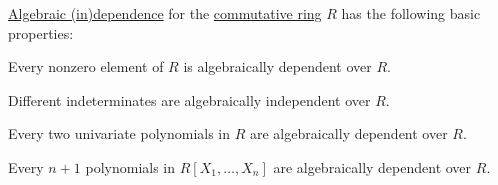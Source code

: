 \begin{proposition}\label{thm:def:algebraic_dependence}
  \hyperref[def:algebraic_dependence]{Algebraic (in)dependence} for the \hyperref[def:commutative_ring]{commutative ring} \( R \) has the following basic properties:
  \begin{thmenum}
     Every nonzero element of \( R \) is algebraically dependent over \( R \).

     Different indeterminates are algebraically independent over \( R \).

     Every two univariate polynomials in \( R \) are algebraically dependent over \( R \).

     Every \( n + 1 \) polynomials in \( R[X_1, \ldots, X_n] \) are algebraically dependent over \( R \).
  \end{thmenum}
\end{proposition}
